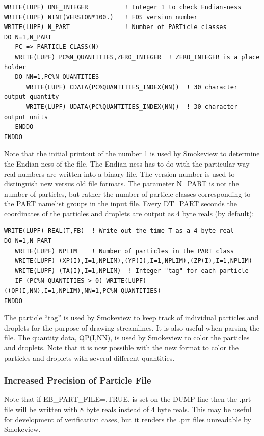 \documentclass[11pt]{book}
\begin{document}
\begin{lstlisting}
WRITE(LUPF) ONE_INTEGER          ! Integer 1 to check Endian-ness
WRITE(LUPF) NINT(VERSION*100.)   ! FDS version number
WRITE(LUPF) N_PART               ! Number of PARTicle classes
DO N=1,N_PART
   PC => PARTICLE_CLASS(N)
   WRITE(LUPF) PC%N_QUANTITIES,ZERO_INTEGER  ! ZERO_INTEGER is a place holder
   DO NN=1,PC%N_QUANTITIES
      WRITE(LUPF) CDATA(PC%QUANTITIES_INDEX(NN))  ! 30 character output quantity
      WRITE(LUPF) UDATA(PC%QUANTITIES_INDEX(NN))  ! 30 character output units
   ENDDO
ENDDO
\end{lstlisting}
Note that the initial printout of the number 1 is used by Smokeview to determine the
Endian-ness of the file. The Endian-ness has to do with the particular way real numbers are written into a binary file.
The version number is used to distinguish new versus old file formats.
The parameter {\ct N\_PART} is not the number of particles, but rather the number of
particle classes corresponding to the {\ct PART} namelist groups in the input file.
Every {\ct DT\_PART} seconds the coordinates of the particles and droplets are output as 4 byte reals (by default):

\begin{lstlisting}
WRITE(LUPF) REAL(T,FB)  ! Write out the time T as a 4 byte real
DO N=1,N_PART
   WRITE(LUPF) NPLIM    ! Number of particles in the PART class
   WRITE(LUPF) (XP(I),I=1,NPLIM),(YP(I),I=1,NPLIM),(ZP(I),I=1,NPLIM)
   WRITE(LUPF) (TA(I),I=1,NPLIM)  ! Integer "tag" for each particle
   IF (PC%N_QUANTITIES > 0) WRITE(LUPF) ((QP(I,NN),I=1,NPLIM),NN=1,PC%N_QUANTITIES)
ENDDO
\end{lstlisting}
The particle ``tag'' is used by Smokeview to keep track of individual particles and droplets for the purpose of drawing
streamlines. It is also useful when parsing the file. The quantity data, {\ct QP(I,NN)}, is used by Smokeview to color
the particles and droplets. Note that it is now possible with the new format to color the particles and droplets with
several different quantities.

\subsubsection*{Increased Precision of Particle File}

Note that if {\ct EB\_PART\_FILE=.TRUE.} is set on the {\ct DUMP} line then the {\ct .prt} file will be written with 8 byte reals instead of 4 byte reals.  This may be useful for development of verification cases, but it renders the {\ct .prt} files unreadable by Smokeview.
\end{document}
